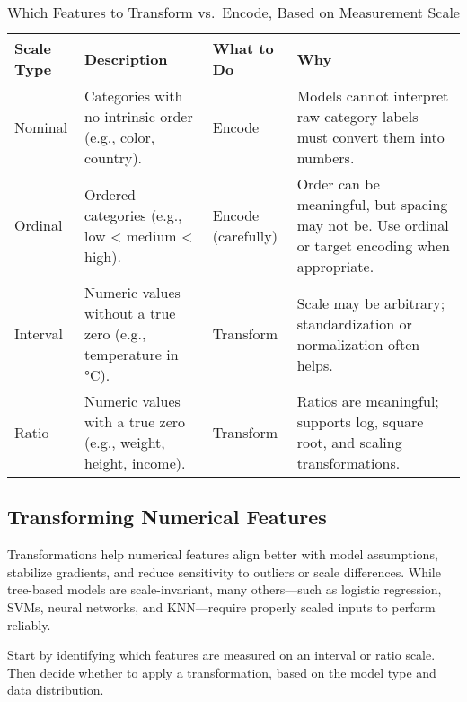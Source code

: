 \documentclass[12pt,openany]{book}
\begin{document}
\begin{table}[H]
\centering
\caption*{Which Features to Transform vs.\ Encode, Based on Measurement Scale}
\vspace{0.5em}
\renewcommand{\arraystretch}{1.4} %
\begin{tabular}{|l|p{3.8cm}|p{3cm}|p{5.2cm}|}
\hline
\textbf{Scale Type} & \textbf{Description} & \textbf{What to Do} & \textbf{Why} \\
\hline
Nominal & Categories with no intrinsic order (e.g., color, country). & Encode & Models cannot interpret raw category labels—must convert them into numbers. \\
\hline
Ordinal & Ordered categories (e.g., low < medium < high). & Encode (carefully) & Order can be meaningful, but spacing may not be. Use ordinal or target encoding when appropriate. \\
\hline
Interval & Numeric values without a true zero (e.g., temperature in °C). & Transform & Scale may be arbitrary; standardization or normalization often helps. \\
\hline
Ratio & Numeric values with a true zero (e.g., weight, height, income). & Transform & Ratios are meaningful; supports log, square root, and scaling transformations. \\
\hline
\end{tabular}
\renewcommand{\arraystretch}{1.0} %
\end{table}


\subsection{Transforming Numerical Features}

Transformations help numerical features align better with model assumptions, stabilize gradients, and reduce sensitivity to outliers or scale differences. While tree-based models are scale-invariant, many others—such as logistic regression, SVMs, neural networks, and KNN—require properly scaled inputs to perform reliably.
\newline

Start by identifying which features are measured on an interval or ratio scale. Then decide whether to apply a transformation, based on the model type and data distribution.
\newline
\end{document}
